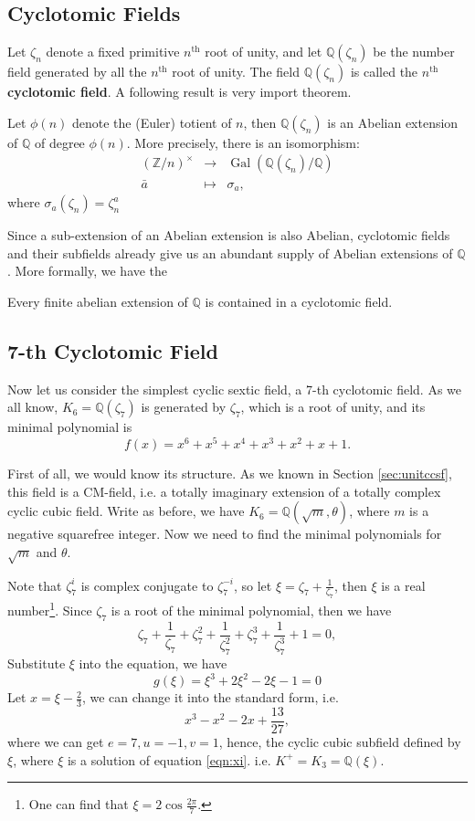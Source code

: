\subsection{Cyclotomic Fields}
Let $\zeta_n$ denote a fixed primitive $n^{\text{th}}$ root of unity, and let $\mathbb{Q}(\zeta_n)$ be the number field generated by all the $n^{\text{th}}$ root of unity. The field $\mathbb{Q}(\zeta_n)$ is called the $n^{\text{th}}$ \textbf{cyclotomic field}. A following result is very import theorem.
\begin{theorem}
Let $\phi(n)$ denote the (Euler) totient of $n$, then $\mathbb{Q}(\zeta_n)$ is an Abelian extension of $\mathbb{Q}$ of degree $\phi(n)$. More precisely, there is an isomorphism:
\begin{eqnarray*}
(\mathbb{Z}/n)^{\times}&\rightarrow & \operatorname{Gal}(\mathbb{Q}(\zeta_n)/\mathbb{Q})\\
\bar{a}&\mapsto & \sigma_a,
\end{eqnarray*}
where $\sigma_a(\zeta_n)=\zeta_n^a$
\end{theorem}
Since a sub-extension of an Abelian extension is also Abelian, cyclotomic fields and their subfields already give us an abundant supply of Abelian extensions of $\mathbb{Q}$.
More formally, we have the 
\begin{theorem}\label{thm:kronecker}
Every finite abelian extension of $\mathbb{Q}$ is contained in a cyclotomic field.
\end{theorem}

\subsection{7-th Cyclotomic Field}
Now let us consider the simplest cyclic sextic field, a 7-th cyclotomic field. As we all know, $K_6=\mathbb{Q}(\zeta_7)$ is generated by $\zeta_7$, which is a root of unity, and its minimal polynomial is $$f(x)=x^6+x^5+x^4+x^3+x^2+x+1.$$

First of all, we would know its structure. As we known in Section \ref{sec:unitccsf}, this field is a CM-field, i.e. a totally imaginary extension of a totally complex cyclic cubic field. Write as before, we have $K_6=\mathbb{Q}(\sqrt{m},\theta)$, where $m$ is a negative squarefree integer. Now we need to find the minimal polynomials for $\sqrt{m}$ and $\theta$.

Note that $\zeta_7^i$ is complex conjugate to $\zeta_7^{-i}$, so let $\xi=\zeta_7+\frac{1}{\zeta_7}$, then $\xi$ is a real number\footnote{One can find that $\xi=2\cos\frac{2\pi}{7}$.}. Since $\zeta_7$ is a root of the minimal polynomial, then we have $$\zeta_7+\frac{1}{\zeta_7}+\zeta_7^2+\frac{1}{\zeta_7^2}+\zeta_7^3+\frac{1}{\zeta_7^3}+1=0,$$ Substitute $\xi$ into the equation, we have \begin{equation}\label{eqn:xi}
g(\xi)=\xi^3+2\xi^2-2\xi-1=0
\end{equation}
Let $x=\xi-\frac{2}{3}$, we can change it into the standard form, i.e. $$x^3-x^2-2x+\frac{13}{27},$$
where we can get $e=7,u=-1,v=1$, hence, the cyclic cubic subfield defined by $\xi$, where $\xi$ is a solution of equation \ref{eqn:xi}. i.e. $K^+=K_3=\mathbb{Q}(\xi)$.

